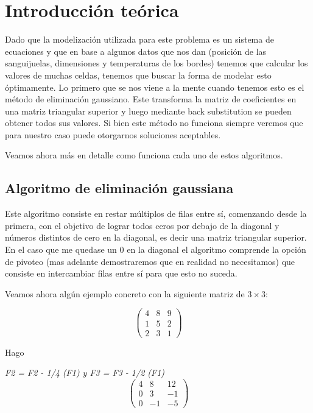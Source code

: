 \section{Introducci\'on te\'orica}

Dado que la modelización utilizada para este problema es un sistema de ecuaciones y que en base a algunos datos que nos dan (posición de las sanguijuelas, dimensiones y temperaturas de los bordes) tenemos que calcular los valores de muchas celdas, tenemos que buscar la forma de modelar esto óptimamente. 
Lo primero que se nos viene a la mente cuando tenemos esto es el método de eliminación gaussiano. Este transforma la matriz de coeficientes en una matriz triangular superior y luego mediante back substitution 
se pueden obtener todos sus valores. Si bien este método no funciona siempre veremos que para nuestro caso puede otorgarnos soluciones aceptables.

Veamos ahora más en detalle como funciona cada uno de estos algoritmos.

\subsection{Algoritmo de eliminación gaussiana}

Este algoritmo consiste en restar múltiplos de filas entre sí, comenzando desde la primera, con el objetivo de lograr todos ceros por debajo de la diagonal y números distintos de cero en la diagonal, 
es decir una matriz triangular superior. En el caso que me quedase un 0 en la diagonal el algoritmo comprende la opción de pivoteo (mas adelante demostraremos que en realidad no necesitamos) que consiste en intercambiar 
filas entre sí para que esto no suceda.

Veamos ahora algún ejemplo concreto con la siguiente matriz de $3 \times 3$:

\[ \left( \begin{array}{ccc}
4 & 8 & 9 \\
1 & 5 & 2 \\
2 & 3 & 1 \end{array} \right)\] 

Hago 

\emph{F2 = F2 - 1/4 (F1) y F3 = F3 - 1/2 (F1)} 
\[ \left( \begin{array}{ccc}
4 & 8 & 12 \\
0 & 3 & -1 \\
0 & -1 & -5 \end{array} \right)\] 

